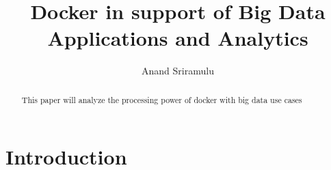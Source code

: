 \documentclass[sigconf]{acmart}
\begin{document}
\title {Docker in support of Big Data Applications and Analytics}


\author{Anand Sriramulu}

\renewcommand{\shortauthors}{Anand S}


\begin{abstract}
This paper will analyze the processing power of docker with big data use cases
\end{abstract}



\maketitle

\section{Introduction}




\begin{acks}

 

\end{acks}


 
\end{document}
